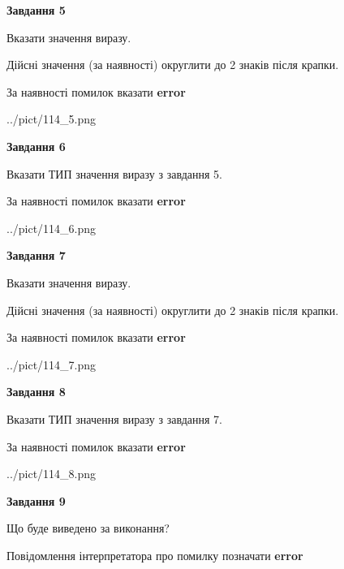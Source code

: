\documentclass[11pt, ukrainian]{article}
\begin{document}
{\begin {large}
{\begin {center}\textbf{Завдання 5}\end {center}}\par
Вказати значення виразу. \par
Дійсні значення (за наявності) округлити до 2 знаків після крапки. \par
За наявності помилок вказати \textbf{error}

\begin{center}
	{../pict/114_5.png}
\end{center}
\newpage

{\begin {center}\textbf{Завдання 6}\end {center}}\par
Вказати ТИП значення виразу з завдання 5. \par
За наявності помилок вказати \textbf{error}

\begin{center}
	{../pict/114_6.png}
\end{center}
\newpage

{\begin {center}\textbf{Завдання 7}\end {center}}\par
Вказати значення виразу. \par
Дійсні значення (за наявності) округлити до 2 знаків після крапки. \par
За наявності помилок вказати \textbf{error}

\begin{center}
	{../pict/114_7.png}
\end{center}
\newpage

{\begin {center}\textbf{Завдання 8}\end {center}}\par
Вказати ТИП значення виразу з завдання 7. \par
За наявності помилок вказати \textbf{error}

\begin{center}
	{../pict/114_8.png}
\end{center}
\newpage

{\begin {center}\textbf{Завдання 9}\end {center}}\par
Що буде виведено за виконання? \par
Повідомлення інтерпретатора про помилку позначати \textbf{error}


\end{large}}
\end{document}
